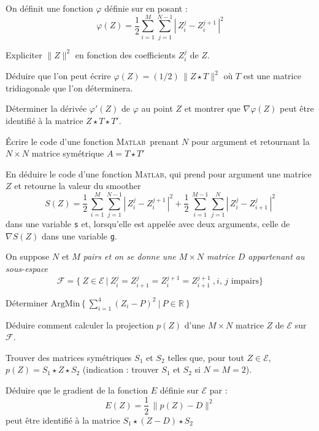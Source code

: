\documentclass[12pt,a4paper,fleqn]{report}
\newcommand{\matlab}{\textsc{Matlab}}
\newcommand{\R}{\mathbb R}
\newcommand{\grad}{\nabla}
\newcommand{\on}{\begin{displaymath}}
\newcommand{\off}{\end{displaymath}}
\begin{document}
\begin{exercice}
On d\'efinit une fonction $\varphi$ d\'efinie sur en posant :
\on \varphi(Z)=\frac{1}{2} \sum_{i=1}^M \sum_{j=1}^{N-1} \left| \, Z_i^j -Z_i^{j+1}\,\right|^2 \off
\begin{questions}
\item Expliciter $\|Z\|^2$ en fonction des coefficients $Z_i^j$ de $Z$.
\item D\'eduire que l'on peut \'ecrire $\varphi(Z)=(1/2)\, \|Z\star T\|^2$ o\`u $T$ est une matrice tridiagonale que l'on d\'eterminera.
\item D\'eterminer la d\'eriv\'ee $\varphi'(Z)$ de $\varphi$ au point $Z$ et montrer que $\grad \varphi(Z)$ peut être identifi\'e \`a la matrice $Z\star T \star T'$.
\item \'Ecrire le code d'une fonction \matlab\ prenant $N$ pour argument et retournant la $N\times N$ matrice sym\'etrique $A=T\star T'$
\item En d\'eduire le code d'une fonction \matlab, qui prend pour argument une matrice $Z$ et retourne la valeur du smoother
\on S(Z) = \frac{1}{2}\, \sum_{i=1}^M \sum_{j=1}^{N-1} \left| \, Z_i^j -Z_i^{j+1}\,\right|^2 +
\frac{1}{2}\,\sum_{i=1}^{M-1} \sum_{j=1}^N \left| \, Z_i^j -Z_{i+1}^j \,\right|^2 \off
dans une variable \texttt{s} et, lorsqu'elle est appel\'ee avec deux arguments, celle de $\grad S(Z)$ dans une variable \texttt{g}.
\end{questions}
\end{exercice}

\begin{exercice}
On suppose $N$ et $M$ \it pairs \rm et on se donne une $M\times N$ matrice $D$ appartenant au sous-espace
\on \mathcal F= \{\ Z\in \mathcal E\ | \ Z_i^j=Z_{i+1}^j=Z_i^{j+1}=Z_{i+1}^{j+1}\ ,\mbox{$i$, $j$ impairs}\} \off
\begin{questions}
\item D\'eterminer $\mathrm{ArgMin}\,\{ \ \sum_{i=1}^4 (Z_i-P)^2 \ | \ P \in \R \ \}$
\item D\'eduire comment calculer la projection $p(Z)$ d'une $M\times N$ matrice $Z$ de $\mathcal E$ sur $\mathcal F$.
\item Trouver des matrices sym\'etriques $S_1$ et $S_2$ telles que, pour tout $Z\in\mathcal E$, $p(Z)=S_1\star Z\star S_2$ (indication : trouver $S_1$ et $S_2$ si $N=M=2$).
\item D\'eduire que le gradient de la fonction $E$ d\'efinie sur $\mathcal E$ par :
\on E(Z)= \frac{1}{2}\,\| p(Z)-D\|^2 \off
peut être identifi\'e \`a la matrice $S_1\star (Z-D)\star S_2$
\end{questions}
\end{exercice}
\end{document}

